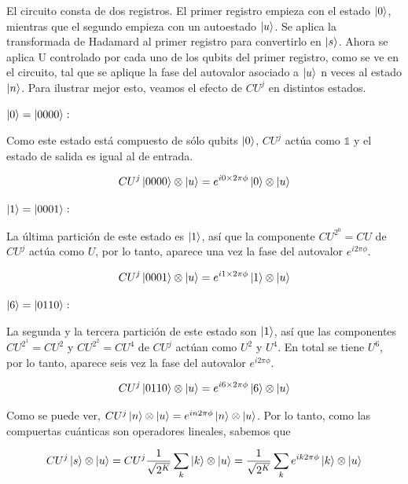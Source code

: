 El circuito consta de dos registros. El primer registro empieza con el estado $\ket{0}$, mientras que el segundo empieza con un autoestado $\ket{u}$. Se aplica la transformada de Hadamard al primer registro para convertirlo en $\ket{s}$. Ahora se aplica U controlado por cada uno de los qubits del primer registro, como se ve en el circuito, tal que se aplique la fase del autovalor asociado a $\ket{u}$ n veces al estado $\ket{n}$. Para ilustrar mejor esto, veamos el efecto de $CU^j$ en distintos estados.

$\ket{0} = \ket{0000}:$

Como este estado está compuesto de sólo qubits $\ket{0}$, $CU^j$ actúa como $\mathds{1}$ y el estado de salida es igual al de entrada.

\begin{equation}
    CU^j \ket{0000} \otimes \ket{u} = e^{i 0 \times 2\pi \phi} \ket{0} \otimes \ket{u}
\end{equation}

$\ket{1} = \ket{0001}:$

La última partición de este estado es $\ket{1}$, así que la componente $CU^{2^0} = CU$ de $CU^j$ actúa como $U$, por lo tanto, aparece una vez la fase del autovalor $e^{i 2\pi \phi}$.

\begin{equation}
    CU^j \ket{0001} \otimes \ket{u} = e^{i 1 \times 2\pi \phi} \ket{1} \otimes \ket{u}
\end{equation}

$\ket{6} = \ket{0110}:$

La segunda y la tercera partición de este estado son $\ket{1}$, así que las componentes $CU^{2^1} = CU^2$ y $CU^{2^2} = CU^4$ de $CU^j$ actúan como $U^2$ y $U^4$. En total se tiene $U^6$, por lo tanto, aparece seis vez la fase del autovalor $e^{i 2\pi \phi}$.

\begin{equation}
    CU^j \ket{0110} \otimes \ket{u} = e^{i 6 \times 2\pi \phi} \ket{6} \otimes \ket{u}
\end{equation}

Como se puede ver, $CU^j \ket{n} \otimes \ket{u} = e^{i n 2\pi \phi} \ket{n} \otimes \ket{u}$. Por lo tanto, como las compuertas cuánticas son operadores lineales, sabemos que

\begin{equation}
    CU^j \ket{s} \otimes \ket{u} = CU^j \frac{1}{\sqrt{2^K}} \sum\limits_k \ket{k} \otimes \ket{u} = \frac{1}{\sqrt{2^K}} \sum\limits_k e^{i k 2\pi \phi} \ket{k} \otimes \ket{u}
\end{equation}

